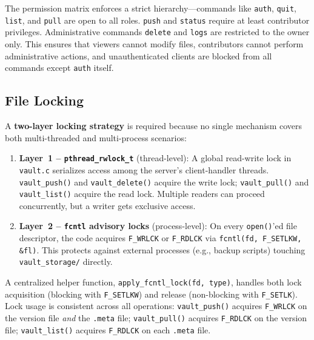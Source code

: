 \documentclass[12pt,a4paper]{article}
\begin{document}
The permission matrix enforces a strict hierarchy---commands like
\texttt{auth}, \texttt{quit}, \texttt{list}, and \texttt{pull} are open to all
roles. \texttt{push} and \texttt{status} require at least contributor privileges.
Administrative commands \texttt{delete} and \texttt{logs} are restricted to the
owner only. This ensures that viewers cannot modify files, contributors cannot
perform administrative actions, and unauthenticated clients are blocked from all
commands except \texttt{auth} itself.

\subsection{File Locking}

A \textbf{two-layer locking strategy} is required because no single mechanism
covers both multi-threaded and multi-process scenarios:

\begin{enumerate}[itemsep=0.3em]
    \item \textbf{Layer~1 -- \texttt{pthread\_rwlock\_t}} (thread-level): A global
          read-write lock in \texttt{vault.c} serializes access among the server's
          client-handler threads. \texttt{vault\_push()} and \texttt{vault\_delete()}
          acquire the write lock; \texttt{vault\_pull()} and \texttt{vault\_list()}
          acquire the read lock. Multiple readers can proceed concurrently, but a
          writer gets exclusive access.

    \item \textbf{Layer~2 -- \texttt{fcntl} advisory locks} (process-level): On
          every \texttt{open()}'ed file descriptor, the code acquires \texttt{F\_WRLCK}
          or \texttt{F\_RDLCK} via \texttt{fcntl(fd, F\_SETLKW, \&fl)}. This protects
          against external processes (e.g., backup scripts) touching
          \texttt{vault\_storage/} directly.
\end{enumerate}

A centralized helper function, \texttt{apply\_fcntl\_lock(fd, type)}, handles both
lock acquisition (blocking with \texttt{F\_SETLKW}) and release (non-blocking with
\texttt{F\_SETLK}). Lock usage is consistent across all operations:
\texttt{vault\_push()} acquires \texttt{F\_WRLCK} on the version file \emph{and}
the \texttt{.meta} file; \texttt{vault\_pull()} acquires \texttt{F\_RDLCK} on the
version file; \texttt{vault\_list()} acquires \texttt{F\_RDLCK} on each
\texttt{.meta} file.
\end{document}
